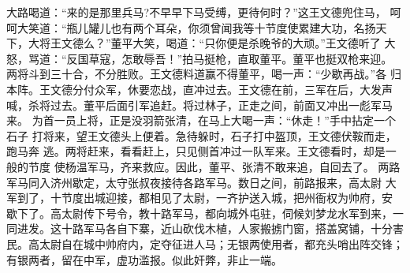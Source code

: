 大路喝道：“来的是那里兵马?不早早下马受缚，更待何时？”这王文德兜住马，
呵呵大笑道：“瓶儿罐儿也有两个耳朵，你须曾闻我等十节度使累建大功，名扬天
下，大将王文德么？”董平大笑，喝道：“只你便是杀晚爷的大顽。”王文德听了
大怒，骂道：“反国草寇，怎敢辱吾！”拍马挺枪，直取董平。董平也挺双枪来迎。
两将斗到三十合，不分胜败。王文德料道赢不得董平，喝一声：“少歇再战。”各
归本阵。王文德分付众军，休要恋战，直冲过去。王文德在前，三军在后，大发声
喊，杀将过去。董平后面引军追赶。将过林子，正走之间，前面又冲出一彪军马来。
为首一员上将，正是没羽箭张清，在马上大喝一声：“休走！”手中拈定一个石子
打将来，望王文德头上便着。急待躲时，石子打中盔顶，王文德伏鞍而走，跑马奔
逃。两将赶来，看看赶上，只见侧首冲过一队军来。王文德看时，却是一般的节度
使杨温军马，齐来救应。因此，董平、张清不敢来追，自回去了。
两路军马同入济州歇定，太守张叔夜接待各路军马。数日之间，前路报来，高太尉
大军到了，十节度出城迎接，都相见了太尉，一齐护送入城，把州衙权为帅府，安
歇下了。高太尉传下号令，教十路军马，都向城外屯驻，伺候刘梦龙水军到来，一
同进发。这十路军马各自下寨，近山砍伐木植，人家搬掳门窗，搭盖窝铺，十分害
民。高太尉自在城中帅府内，定夺征进人马；无银两使用者，都充头哨出阵交锋；
有银两者，留在中军，虚功滥报。似此奸弊，非止一端。

